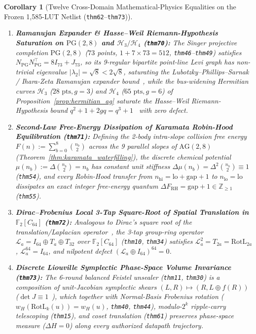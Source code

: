 \documentclass[11pt,letterpaper]{article}
\theoremstyle{spectralthm}
\newtheorem{corollary}[theorem]{Corollary}
\begin{document}
\begin{corollary}[Twelve Cross-Domain Mathematical-Physics Equalities on the Frozen 1,585-LUT Netlist (\texttt{thm62}--\texttt{thm73})]
\begin{enumerate}[leftmargin=1.4em,label=\textup{(\roman*)},topsep=2pt,itemsep=1.5pt]
  \item \textbf{Ramanujan Expander \& Hasse--Weil Riemann-Hypothesis Saturation on $\mathrm{PG}(2,8)$ and $\mathcal{H}_3/\mathcal{H}_4$ (\texttt{thm70}):} The Singer projective completion $\mathrm{PG}(2,8)$ ($73$ points, $1+7\times 73=512$, \texttt{thm46}--\texttt{thm49}) satisfies $N_{\mathrm{PG}}N_{\mathrm{PG}}^\top = 8I_{73}+J_{73}$, so its 9-regular bipartite point-line Levi graph has non-trivial eigenvalue $|\lambda_2| = \sqrt{8} < 2\sqrt{8}$, saturating the Lubotzky--Phillips--Sarnak / Ihara-Zeta Ramanujan expander bound~\cite{lubotzky1988ramanujan}, while the bus-widening Hermitian curves $\mathcal{H}_3$ ($28\text{~pts}, g=3$) and $\mathcal{H}_4$ ($65\text{~pts}, g=6$) of Proposition~\ref{prop:hermitian_ag} saturate the Hasse--Weil Riemann-Hypothesis bound $q^2 + 1 + 2g q = q^3 + 1$~\cite{weil1948courbes} with zero defect.
  \item \textbf{Second-Law Free-Energy Dissipation of Karamata Robin-Hood Equilibration (\texttt{thm71}):} Defining the 2-body intra-slope collision free energy $F(n) := \sum_{b=0}^8 \binom{n_b}{2}$ across the 9 parallel slopes of $\mathrm{AG}(2,8)$ (Theorem~\ref{thm:karamata_waterfilling}), the discrete chemical potential $\mu(n_b) := \Delta\binom{n_b}{2} = n_b$ has constant unit stiffness $\Delta\mu(n_b) = \Delta^2\binom{n_b}{2} \equiv 1$ (\texttt{thm54}), and every Robin-Hood transfer from $n_{\mathrm{hi}} = \mathrm{lo}+\mathrm{gap}+1$ to $n_{\mathrm{lo}} = \mathrm{lo}$ dissipates an exact integer free-energy quantum $\Delta F_{\mathrm{RH}} = \mathrm{gap} + 1 \in \mathbb{Z}_{\ge 1}$ (\texttt{thm55}).
  \item \textbf{Dirac--Frobenius Local 3-Tap Square-Root of Spatial Translation in $\mathbb{F}_2[C_{64}]$ (\texttt{thm72}):} Analogous to Dirac's square root of the translation/Laplacian operator~\cite{dirac1928quantum}, the 3-tap group-ring operator $\mathcal{L}_a = I_{64} \oplus T_a \oplus T_{32}$ over $\mathbb{F}_2[C_{64}]$ (\texttt{thm10}, \texttt{thm34}) satisfies $\mathcal{L}_a^2 = T_{2a} = \mathrm{RotL}_{2a}$, $\mathcal{L}_a^{64} = I_{64}$, and nilpotent defect $(\mathcal{L}_a \oplus I_{64})^{64} = 0$.
  \item \textbf{Discrete Liouville Symplectic Phase-Space Volume Invariance (\texttt{thm73}):} The 6-round balanced Feistel unsealer (\texttt{thm11}, \texttt{thm30}) is a composition of unit-Jacobian symplectic shears $(L,R)\mapsto(R,L\oplus f(R))$ ($\det J \equiv 1$~\cite{liouville1838note}), which together with Normal-Basis Frobenius rotation ($w_H(\mathrm{RotL}_k(u)) = w_H(u)$, \texttt{thm40}, \texttt{thm44}), modulo-$2^k$ ripple-carry telescoping (\texttt{thm15}), and coset translation (\texttt{thm61}) preserves phase-space measure ($\Delta H = 0$) along every authorized datapath trajectory.
\end{enumerate}
\end{corollary}
\end{document}
